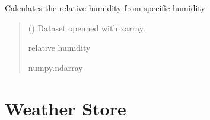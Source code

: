 \documentclass[a4paper,11pt,english]{sphinxmanual}
\begin{document}

\begin{fulllineitems}
\label{\detokenize{modules:envlib.calc_altrv_vars.get_rh_sd}}
\pysigstartsignatures
{}
\pysigstopsignatures
\sphinxAtStartPar
Calculates the relative humidity from specific humidity
\begin{quote}\begin{description}
\sphinxAtStartPar
{} () \textendash{} Dataset openned with xarray.

\sphinxAtStartPar
relative humidity

\sphinxAtStartPar
numpy.ndarray

\end{description}\end{quote}

\end{fulllineitems}



\section{Weather Store}
\label{\detokenize{modules:weather-store}}
\end{document}
